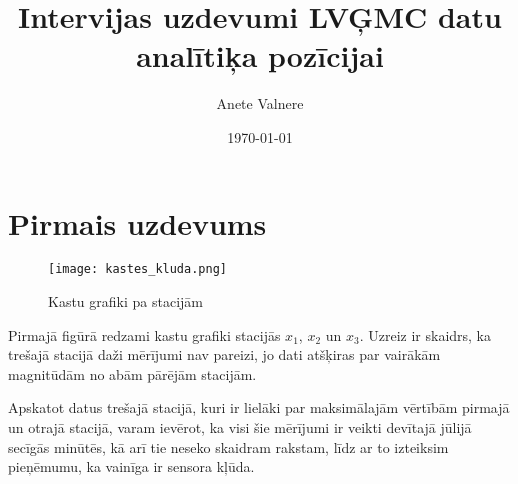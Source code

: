 \documentclass[12pt,a4paper]{article}
\title{Intervijas uzdevumi LVĢMC datu analītiķa pozīcijai}
\author{Anete Valnere}
\date{\today}
\begin{document}
\section*{Pirmais uzdevums}


\begin{figure}[h]
    \centering
    \texttt{[image: kastes\_kluda.png]}
    \caption{Kastu grafiki pa stacijām}
\end{figure}
Pirmajā figūrā redzami kastu grafiki stacijās \(x_1\), \(x_2\) un \(x_3\). Uzreiz ir skaidrs, ka trešajā stacijā daži mērījumi nav pareizi, jo dati atšķiras par vairākām magnitūdām no abām pārējām stacijām.%


Apskatot datus trešajā stacijā, kuri ir lielāki par maksimālajām vērtībām pirmajā un otrajā stacijā, varam ievērot, ka visi šie mērījumi ir veikti devītajā jūlijā secīgās minūtēs, kā arī tie neseko skaidram rakstam, līdz ar to izteiksim pieņēmumu, ka vainīga ir sensora kļūda.
\end{document}
